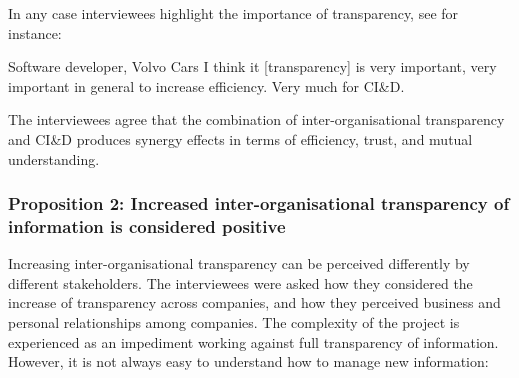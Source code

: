 In any case interviewees highlight the importance of transparency, see for instance:

\begin{aquote}{Software developer, Volvo Cars}
I think it [transparency] is very important, very important in general to increase efficiency. Very much for CI\&D. 
\end{aquote}

 The interviewees agree that the combination of inter-organisational transparency and CI\&D produces synergy effects in terms of efficiency, trust, and mutual understanding.

\vspace{.2cm}
\subsubsection{Proposition 2: Increased inter-organisational transparency of information is considered positive}

Increasing inter-organisational transparency can be perceived differently by different stakeholders. The interviewees were asked how they considered the increase of transparency across companies, and how they perceived business and personal relationships among companies. The complexity of the project is experienced as an impediment working against full transparency of information.
However, it is not always easy to understand how to manage  new information:


